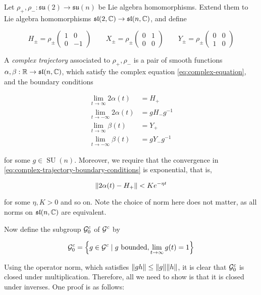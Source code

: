 \documentclass{report}
\DeclareMathOperator{\SU}{SU}
\newcommand{\su}{\mathfrak{su}}
\renewcommand{\sl}{\mathfrak{sl}}
\begin{document}
Let \(\rho_+, \rho_- : \su(2) \to \su(n)\) be Lie algebra homomorphisms. Extend them to Lie algebra homomorphisms \(\sl(2, \C) \to \sl(n, \C)\), and define

\[H_{\pm} = \rho_\pm\begin{pmatrix}
    1 & 0 \\
    0 & -1
\end{pmatrix} \qquad X_\pm = \rho_\pm \begin{pmatrix}
    0 & 1 \\
    0 & 0
\end{pmatrix} \qquad Y_\pm = \rho_\pm \begin{pmatrix}
    0 & 0 \\
    1 & 0
\end{pmatrix}\]

\begin{definition}
     A \emph{complex trajectory} associated to \(\rho_+, \rho_-\) is a pair of smooth functions \(\alpha, \beta : \R \to \sl(n, \C)\), which satisfy the complex equation \cref{eq:complex-equation}, and the boundary conditions

    \begin{equation}
        \label{eq:complex-trajectory-boundary-conditions}
        \begin{split}
            \lim_{t \to \infty}2\alpha(t) &= H_+ \\
            \lim_{t \to -\infty}2\alpha(t) &= gH_-g^{-1} \\
            \lim_{t \to \infty}\beta(t) &= Y_+ \\
            \lim_{t \to -\infty}\beta(t) &= gY_-g^{-1}
        \end{split}
    \end{equation}

    for some \(g \in \SU(n)\). Moreover, we require that the convergence in \cref{eq:complex-trajectory-boundary-conditions} is exponential, that is,

    \[\norm{2\alpha(t) - H_+} < Ke^{-\eta t}\]

    for some \(\eta, K > 0\) and so on. Note the choice of norm here does not matter, as all norms on \(\sl(n, \C)\) are equivalent.
\end{definition}

Now define the subgroup \(\mathcal{G}^c_0\) of \(\mathcal{G}^c\) by

\[\mathcal{G}^c_0 = \left\{g \in \mathcal{G}^c \mid g \text{ bounded}, \lim_{t \to \infty}g(t) = 1\right\}\]

Using the operator norm, which satisfies \(\norm{gh} \le \norm{g}\norm{h}\), it is clear that \(\mathcal{G}_0^c\) is closed under multiplication. Therefore, all we need to show is that it is closed under inverses. One proof is as follows:
\end{document}
